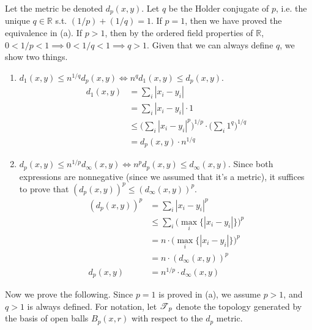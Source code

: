   \begin{solution}[Munkres 20.1.b]
    Let the metric be denoted $d_p (x, y)$. Let $q$ be the Holder conjugate of $p$, i.e. the unique $q \in \mathbb{R}$ s.t. $(1/p) + (1/q) = 1$. If $p = 1$, then we have proved the equivalence in (a). If $p > 1$, then by the ordered field properties of $\mathbb{R}$, $0 < 1/p < 1 \implies 0 < 1/q < 1 \implies q > 1$. Given that we can always define $q$, we show two things. 
    \begin{enumerate}
      \item $d_1 (x, y) \leq n^{1/q} d_p (x, y) \iff n^q d_1 (x, y) \leq d_p (x, y)$. 
      \begin{align}
        d_1 (x, y) & = \sum_i |x_i - y_i| \\ 
                   & = \sum_i |x_i - y_i| \cdot 1 \\
                   & \leq \bigg( \sum_i |x_i - y_i|^p \bigg)^{1/p} \cdot \bigg(\sum_i 1^q \bigg)^{1/q} \\
                   & = d_p (x, y) \cdot n^{1/q}
      \end{align} 

      \item $d_p (x, y) \leq n^{1/p} d_\infty (x, y) \iff n^p d_p (x, y) \leq d_\infty (x, y)$. Since both expressions are nonnegative (since we assumed that it's a metric), it suffices to prove that $(d_p (x, y))^p \leq (d_\infty (x, y))^{p}$. 
      \begin{align}
        (d_p(x, y))^p & = \sum_i |x_i - y_i|^p \\
                      & \leq \sum_i \big( \max_i \{ |x_i - y_i| \} \big)^p \\
                      & = n \cdot \big( \max_i \{ |x_i - y_i| \} \big)^p \\ 
                      & = n \cdot (d_\infty (x, y))^p \\
        d_p(x, y)     & = n^{1/p} \cdot d_\infty (x, y)
      \end{align}
    \end{enumerate} 
    Now we prove the following. Since $p = 1$ is proved in (a), we assume $p > 1$, and $q > 1$ is always defined. For notation, let $\operatorname{\mathscr{T}}_p$ denote the topology generated by the basis of open balls $B_p (x, r)$ with respect to the $d_p$ metric. 


\end{solution}
